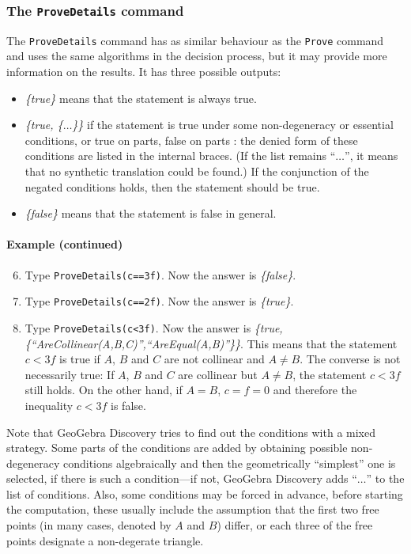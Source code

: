 \documentclass{article}
\begin{document}
\subsubsection{The \texttt{ProveDetails} command}
The \texttt{ProveDetails} command has as similar behaviour as the \texttt{Prove} command and uses the same algorithms in the decision process, but it may provide more information on the results. It has three possible outputs:
\begin{itemize}
    \item \textit{\{true\}} means that the statement is always true.
    \item \textit{\{true, \{$\ldots$\}\}} if the statement is true under some non-degeneracy \cite{Chou,RecioVelez} or essential \cite{KovacsRecioSolyomGecse} conditions, or true on parts, false on parts \cite{BotanaRecio2016,KovacsRecioVelez}: the denied form of these conditions are listed in the internal braces. (If the list remains ``$\ldots$'', it means that no synthetic translation could be found.)  If the conjunction of the negated conditions holds, then the statement should be true.
    \item \textit{\{false\}} means that the statement is false in general.
\end{itemize}
\paragraph{Example (continued)}
\begin{enumerate}
\setcounter{enumi}{5}
    \item Type \texttt{ProveDetails(c==3f)}. Now the answer is \textit{\{false\}}.
    \item Type \texttt{ProveDetails(c==2f)}. Now the answer is \textit{\{true\}}.
    \item Type \texttt{ProveDetails(c<3f)}. Now the answer is \textit{\{true,\{``AreCollinear(A,B,C)'',``AreEqual(A,B)''\}\}}. This means that the statement $c<3f$ is true if $A$, $B$ and $C$ are not collinear and $A\neq B$. The converse is not necessarily true: If $A$, $B$ and $C$ are collinear but $A\neq B$, the statement $c<3f$ still holds. On the other hand, if $A=B$, $c=f=0$ and therefore the inequality $c<3f$ is false.
\end{enumerate}
Note that GeoGebra Discovery tries to find out the conditions with a mixed strategy. Some parts of the conditions are added by obtaining possible non-degeneracy conditions algebraically and then the geometrically ``simplest'' one is selected, if there is such a condition---if not, GeoGebra Discovery adds ``$\ldots$'' to the list of conditions. Also, some conditions may be forced in advance, before starting the computation, these usually include the assumption that the first two free points (in many cases, denoted by $A$ and $B$) differ, or each three of the free points designate a non-degerate triangle.
\end{document}
